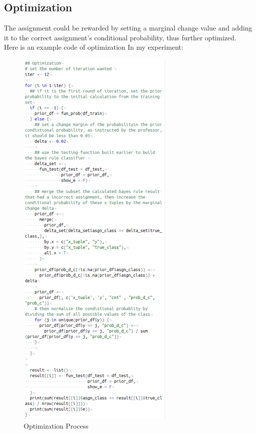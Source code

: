 \documentclass{article}
\begin{document}
\begin{multicols}{2}
    \subsection{Optimization}
        The assignment could be rewarded by setting a marginal change value and adding it to the correct assignment's conditional probability, thus further optimized.
        Here is an example code of optimization In my experiment:
        \begin{figure}[H]
            \centering 
            \includegraphics[width=\linewidth]{fig11.png}
            \caption{Optimization Process }
        \end{figure}


\end{multicols}
\end{document}
